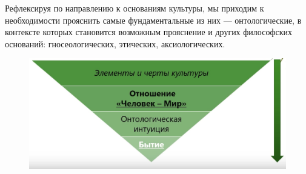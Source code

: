 
Рефлексируя по направлению к основаниям
культуры, мы приходим к необходимости прояснить самые фундаментальные из них --- онтологические, 
в контексте которых становится возможным прояснение и других
философских оснований: гносеологических, этических, аксиологических.

\begin{figure}[H]
    \centering
    \includegraphics[width=0.8\linewidth]{pictures/hz.png}
    \label{hz}
\end{figure}

